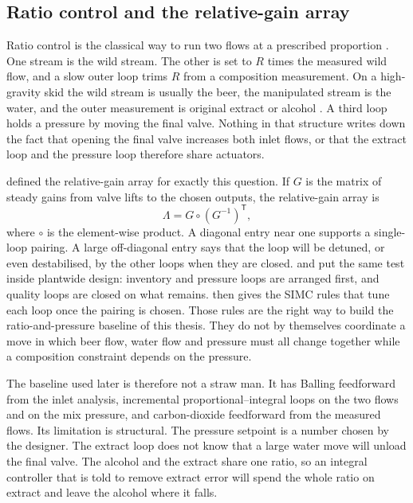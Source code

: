 \subsection{Ratio control and the relative-gain array}

Ratio control is the classical way to run two flows at a prescribed proportion \citep{shinskey1996,seborg2016}. One stream is the wild stream. The other is set to $R$ times the measured wild flow, and a slow outer loop trims $R$ from a composition measurement. On a high-gravity skid the wild stream is usually the beer, the manipulated stream is the water, and the outer measurement is original extract or alcohol \citep{centec2024,corosysweb}. A third loop holds a pressure by moving the final valve. Nothing in that structure writes down the fact that opening the final valve increases both inlet flows, or that the extract loop and the pressure loop therefore share actuators.

\citet{bristol1966} defined the relative-gain array for exactly this question. If $G$ is the matrix of steady gains from valve lifts to the chosen outputs, the relative-gain array is
\begin{equation}
\label{eq:rga}
\Lambda = G \circ (G^{-1})^{\mathsf T},
\end{equation}
where $\circ$ is the element-wise product. A diagonal entry near one supports a single-loop pairing. A large off-diagonal entry says that the loop will be detuned, or even destabilised, by the other loops when they are closed. \citet{skogestad2004} and \citet{downs2011} put the same test inside plantwide design: inventory and pressure loops are arranged first, and quality loops are closed on what remains. \citet{skogestad2003} then gives the SIMC rules that tune each loop once the pairing is chosen. Those rules are the right way to build the ratio-and-pressure baseline of this thesis. They do not by themselves coordinate a move in which beer flow, water flow and pressure must all change together while a composition constraint depends on the pressure.

The baseline used later is therefore not a straw man. It has Balling feedforward from the inlet analysis, incremental proportional--integral loops on the two flows and on the mix pressure, and carbon-dioxide feedforward from the measured flows. Its limitation is structural. The pressure setpoint is a number chosen by the designer. The extract loop does not know that a large water move will unload the final valve. The alcohol and the extract share one ratio, so an integral controller that is told to remove extract error will spend the whole ratio on extract and leave the alcohol where it falls.

